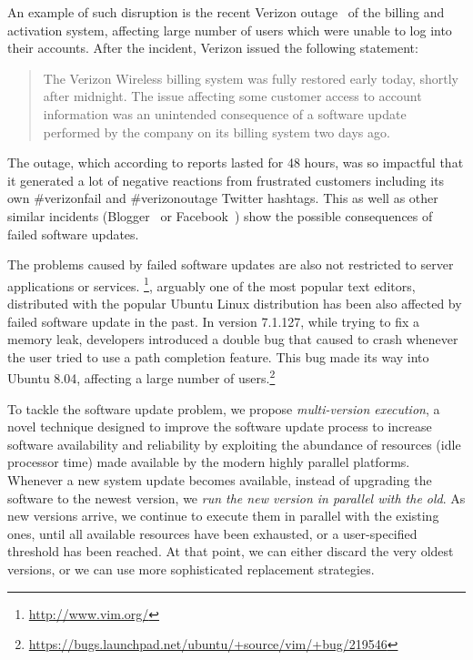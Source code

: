 An example of such disruption is the recent Verizon
outage~\cite{verizon-outage2014} of the billing and activation system,
affecting large number of users which were unable to log into their accounts.
After the incident, Verizon issued the following statement:
\begin{quotation}
The Verizon Wireless billing system was fully restored early today, shortly
after midnight. The issue affecting some customer access to account information
was an unintended consequence of a software update performed by the company on
its billing system two days ago.
\end{quotation}
The outage, which according to reports lasted for 48 hours, was so impactful
that it generated a lot of negative reactions from frustrated customers
including its own \#verizonfail and \#verizonoutage Twitter hashtags.  This as
well as other similar incidents (\eg Blogger~\cite{blogger-incident2011} or
Facebook~\cite{facebook-incident2010}) show the possible consequences of failed
software updates.

The problems caused by failed software updates are also not restricted to
server applications or services. \vim\footnote{\url{http://www.vim.org/}},
arguably one of the most popular text editors, distributed with the popular
Ubuntu Linux distribution has been also affected by failed software update in
the past.  In version 7.1.127, while trying to fix a memory leak, \vim
developers introduced a double  bug that caused \vim to crash
whenever the user tried to use a path completion feature.  This bug made its
way into Ubuntu 8.04, affecting a large number of
users.\footnote{\url{https://bugs.launchpad.net/ubuntu/+source/vim/+bug/219546}}

To tackle the software update problem, we propose \emph{multi-version
execution}, a novel technique
designed to improve the software update process to increase software
availability and reliability by exploiting the abundance of resources (\eg idle
processor time) made available by the modern highly parallel platforms.
Whenever a new system update becomes available, instead of upgrading the
software to the newest version, we \emph{run the new version in parallel with
the old}. As new versions arrive, we continue to execute them in parallel with
the existing ones, until all available resources have been exhausted, or a
user-specified threshold has been reached.  At that point, we can either
discard the very oldest versions, or we can use more sophisticated replacement
strategies.

